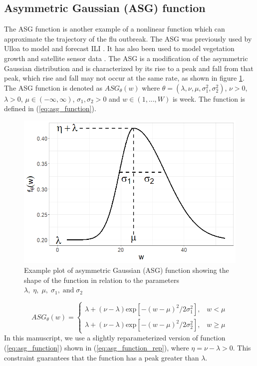 \subsection{Asymmetric Gaussian (ASG) function} \label{sec:asg_func}
The ASG function is another example of a nonlinear function which can 
approximate the trajectory of the flu outbreak. The ASG was previously used 
by Ulloa to model and forecast ILI \cite[]{ulloa2019}. It has also been used 
to model vegetation growth and satellite sensor data 
\cite[]{lewis2020extracting, jonsson2002seasonality, hird2009noise, 
beck2006improved, atkinson2012inter}. The ASG is a modification of the 
asymmetric Gaussian distribution \cite[]{wallis2014two} and is characterized 
by its rise to a peak and fall from that peak, which rise and fall 
may not occur at the same 
rate, as shown in figure \ref{fig:asg_function}. The ASG function is denoted 
as $ASG_\theta(w)$ where 
$\theta = (\lambda, \nu, \mu, \sigma_1^2, \sigma_2^2)$, $\nu > 0$, 
$\lambda > 0$, $\mu \in (-\infty, \infty)$, $\sigma_1, \sigma_2 > 0$ and 
$w \in (1, ..., W)$ is week. The function is defined in 
(\ref{eq:asg_function}).

\begin{figure}[hbt!]
    \centering
    \includegraphics[scale=.45]{Images/asg_function.png}
    \caption{Example plot of asymmetric Gaussian (ASG) function showing the 
    shape of the function in relation to the parameters 
    $\lambda, \; \eta, \; \mu, \; \sigma_1, \; \text{and} \; \sigma_2$}
    \label{fig:asg_function}
\end{figure}

\begin{equation}
    \label{eq:asg_function}
    ASG_{\theta}(w) = 
    \begin{cases}
        \lambda + (\nu - \lambda) \text{exp}[-(w - \mu)^2/2\sigma^2_1], \;\;\; w < \mu \\
        \lambda + (\nu - \lambda) \text{exp}[-(w - \mu)^2/2\sigma^2_2], \;\;\; w \geq \mu
    \end{cases}
\end{equation}
In this manuscript, we use a slightly reparameterized version of function
(\ref{eq:asg_function}) shown in (\ref{eq:asg_function_rep}), 
where $\eta = \nu - \lambda > 0$. 
This constraint guarantees that the function has a peak greater than $\lambda$.

